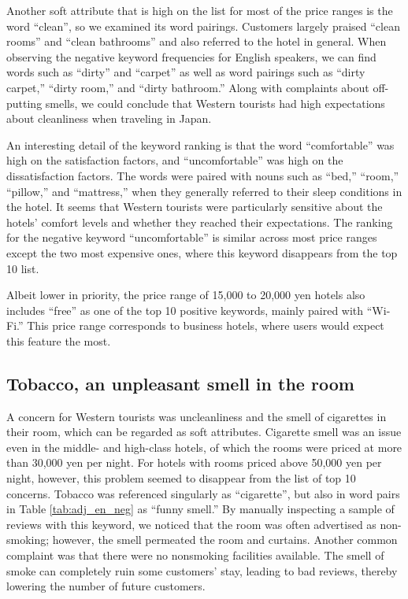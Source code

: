 \documentclass[smallextended,natbib]{svjour3}       %
\begin{document}
    Another soft attribute that is high on the list for most of the price ranges is the word ``clean'', so we examined its word pairings. Customers largely praised ``clean rooms'' and ``clean bathrooms'' and also referred to the hotel in general. When observing the negative keyword frequencies for English speakers, we can find words such as ``dirty'' and ``carpet'' as well as word pairings such as ``dirty carpet,'' ``dirty room,'' and ``dirty bathroom.'' Along with complaints about off-putting smells, we could conclude that Western tourists had high expectations about cleanliness when traveling in Japan.

    An interesting detail of the keyword ranking is that the word ``comfortable'' was high on the satisfaction factors, and ``uncomfortable'' was high on the dissatisfaction factors. The words were paired with nouns such as ``bed,'' ``room,'' ``pillow,'' and ``mattress,'' when they generally referred to their sleep conditions in the hotel.
    It seems that Western tourists were particularly sensitive about the hotels’ comfort levels and whether they reached their expectations. The ranking for the negative keyword ``uncomfortable'' is similar across most price ranges except the two most expensive ones, where this keyword disappears from the top 10 list.

    Albeit lower in priority, the price range of 15,000 to 20,000 yen hotels also includes ``free'' as one of the top 10 positive keywords, mainly paired with ``Wi-Fi.'' This price range corresponds to business hotels, where users would expect this feature the most. 

  \subsection{Tobacco, an unpleasant smell in the room}\label{disc:tobacco}

    A concern for Western tourists was uncleanliness and the smell of cigarettes in their room, which can be regarded as soft attributes. Cigarette smell was an issue even in the middle- and high-class hotels, of which the rooms were priced at more than 30,000 yen per night. For hotels with rooms priced above 50,000 yen per night, however, this problem seemed to disappear from the list of top 10 concerns. Tobacco was referenced singularly as ``cigarette'', but also in word pairs in Table \ref{tab:adj_en_neg} as ``funny smell.'' By manually inspecting a sample of reviews with this keyword, we noticed that the room was often advertised as non-smoking; however, the smell permeated the room and curtains. Another common complaint was that there were no nonsmoking facilities available. The smell of smoke can completely ruin some customers’ stay, leading to bad reviews, thereby lowering the number of future customers.
\end{document}

